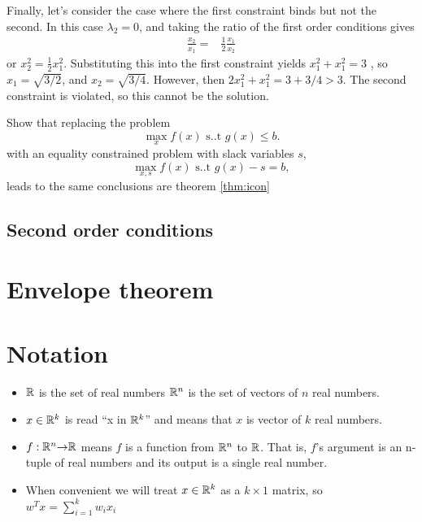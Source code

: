\begin{example}
  Finally, let's consider the case where the first constraint binds
  but not the second. In this case $\lambda_2 = 0$, and taking the
  ratio of the first order conditions gives
  \begin{align*} 
    \frac{x_2}{x_1} = & \frac{1}{2} \frac{x_1}{x_2}
  \end{align*}
  or $x_2^2 = \frac{1}{2} x_1^2$. Substituting this into the first
  constraint yields $x_1^2 + x_1^2 = 3$ , so $x_1 = \sqrt{3/2}$, and
  $x_2 = \sqrt{3/4}$. However, then $2x_1^2 + x_1^2 = 3 + 3/4 >
  3$. The second constraint is violated, so this cannot be the solution.   
\end{example}

\begin{example}
  Show that replacing the problem 
  \[ \max_x f(x) \text{ s..t } g(x) \leq b. \]
  with an equality constrained problem with slack variables $s$, 
  \[ \max_{x,s} f(x) \text{ s..t } g(x) - s = b, \]
  leads to the same conclusions are theorem \ref{thm:icon}
\end{example}


\subsection{Second order conditions}


\section{Envelope theorem}


\appendix

\section{Notation \label{sec:notation}}
\begin{itemize}
\item $\mathbb{R}$ is the set of real numbers $\mathbb{R}^n$ is the set of
  vectors of $n$ real numbers.
\item $x \in \mathbb{R}^k$ is read ``x in $\mathbb{R}^k$'' and means that $x$ is
  vector of $k$ real numbers.
\item $f: \mathbb{R}^n {\rightarrow} \mathbb{R}$ means $f$ is a function from $\mathbb{R}^n$ to
  $\mathbb{R}$. That is, $f$'s argument is an n-tuple of real numbers and
  its output is a single real number.
\item When convenient we will treat $x \in \mathbb{R}^k$ as a $k \times 1$
  matrix, so $w^T x = \sum_{i=1}^k w_i x_i$
\end{itemize}


